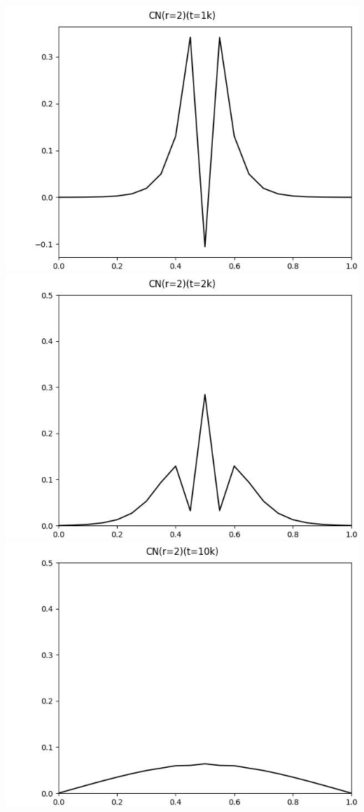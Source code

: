 \documentclass[12pt]{ctexart}
\begin{document}
\includegraphics[scale=0.35]{CN(r=2)(t=1k).jpg}
\includegraphics[scale=0.35]{CN(r=2)(t=2k).jpg}
\includegraphics[scale=0.35]{CN(r=2)(t=10k).jpg}
\end{document}
